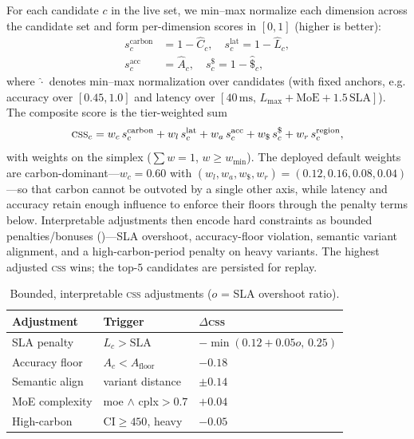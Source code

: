 \documentclass[10pt,twocolumn]{article}
\newcommand{\css}{\textsc{css}}
\begin{document}
For each candidate $c$ in the live set, we min--max normalize each dimension
across the candidate set and form per-dimension scores in $[0,1]$ (higher is
better):
\begin{align}
s^{\text{carbon}}_c  &= 1 - \widehat{C}_c, \quad
s^{\text{lat}}_c      = 1 - \widehat{L}_c, \nonumber\\
s^{\text{acc}}_c     &= \widehat{A}_c, \quad
s^{\$}_c              = 1 - \widehat{\$}_c,
\end{align}
where $\widehat{\cdot}$ denotes min--max normalization over candidates (with
fixed anchors, e.g. accuracy over $[0.45, 1.0]$ and latency over
$[40\,\text{ms},\, L_{\max}{+}\text{MoE}{+}1.5\,\text{SLA}]$). The composite
score is the tier-weighted sum
\begin{equation}
\text{\css}_c = w_c\, s^{\text{carbon}}_c + w_l\, s^{\text{lat}}_c
              + w_a\, s^{\text{acc}}_c + w_{\$}\, s^{\$}_c
              + w_r\, s^{\text{region}}_c ,
\label{eq:css}
\end{equation}
with weights on the simplex ($\sum w = 1$, $w \ge w_{\min}$). The deployed
default weights are carbon-dominant---$w_c{=}0.60$ with
$(w_l,w_a,w_{\$},w_r){=}(0.12,0.16,0.08,0.04)$---so that carbon cannot be
outvoted by a single other axis, while latency and accuracy retain enough
influence to enforce their floors through the penalty terms below.
Interpretable adjustments then encode hard constraints as bounded
penalties/bonuses ()---SLA overshoot, accuracy-floor
violation, semantic variant alignment, and a high-carbon-period penalty on
heavy variants. The highest adjusted \css{} wins; the top-$5$ candidates are
persisted for replay.

\begin{table}[t]
  \centering \small
  \begin{tabular}{@{}p{}p{}p{}@{}}
    \toprule
    \textbf{Adjustment} & \textbf{Trigger} & \textbf{$\Delta$\css} \\
    \midrule
    SLA penalty & $L_c > \text{SLA}$ & $-\min(0.12{+}0.05o,\,0.25)$ \\
    Accuracy floor & $A_c < A_{\text{floor}}$ & $-0.18$ \\
    Semantic align & variant distance & $\pm0.14$ \\
    MoE complexity & moe $\wedge$ cplx${>}0.7$ & $+0.04$ \\
    High-carbon & CI${\ge}450$, heavy & $-0.05$ \\
    \bottomrule
  \end{tabular}
  \caption{Bounded, interpretable \css{} adjustments ($o$ = SLA overshoot ratio).}
  \label{tab:adjust}
\end{table}
\end{document}

